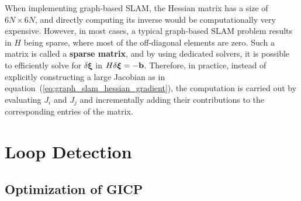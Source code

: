 When implementing graph-based SLAM, the Hessian matrix has a size of $6N \times 6N$, and directly computing its inverse would be computationally very expensive.
However, in most cases, a typical graph-based SLAM problem results in $H$ being sparse, where most of the off-diagonal elements are zero.
Such a matrix is called a {\bf sparse matrix}, and by using dedicated solvers, it is possible to efficiently solve for $\delta \boldsymbol \xi$ in $H \delta \boldsymbol \xi = -{\bf b}$.
Therefore, in practice, instead of explicitly constructing a large Jacobian as in equation~(\ref{eq:graph_slam_hessian_gradient}), the computation is carried out by evaluating $J_{i}$ and $J_{j}$ and incrementally adding their contributions to the corresponding entries of the matrix.













\section{Loop Detection}
\label{subsec:gicp}

\subsection{Optimization of GICP}

